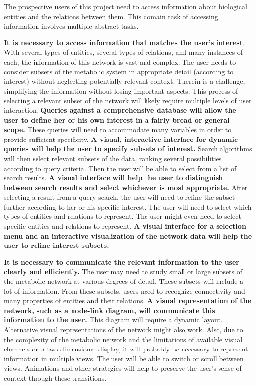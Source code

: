 The prospective users of this project need to access information about biological entities and the relations between them.
This domain task of accessing information involves multiple abstract tasks.

\textbf{It is necessary to access information that matches the user's interest}.
With several types of entities, several types of relations, and many instances of each, the information of this network is vast and complex.
The user needs to consider subsets of the metabolic system in appropriate detail (according to interest) without neglecting potentially-relevant context.
Therein is a challenge, simplifying the information without losing important aspects.
This process of selecting a relevant subset of the network will likely require multiple levels of user interaction.
\textbf{Queries against a comprehensive database will allow the user to define her or his own interest in a fairly broad or general scope.}
These queries will need to accommodate many variables in order to provide sufficient specificity.
\textbf{A visual, interactive interface for dynamic queries will help the user to specify subsets of interest.}
Search algorithms will then select relevant subsets of the data, ranking several possibilities according to query criteria.
Then the user will be able to select from a list of search results.
\textbf{A visual interface will help the user to distinguish between search results and select whichever is most appropriate.}
After selecting a result from a query search, the user will need to refine the subset further according to her or his specific interest.
The user will need to select which types of entities and relations to represent.
The user might even need to select specific entities and relations to represent.
\textbf{A visual interface for a selection menu and an interactive visualization of the network data will help the user to refine interest subsets.}

\textbf{It is necessary to communicate the relevant information to the user clearly and efficiently.}
The user may need to study small or large subsets of the metabolic network at various degrees of detail.
These subsets will include a lot of information.
From these subsets, users need to recognize connectivity and many properties of entities and their relations.
\textbf{A visual representation of the network, such as a node-link diagram, will communicate this information to the user.}
This diagram will require a dynamic layout.
Alternative visual representations of the network might also work.
Also, due to the complexity of the metabolic network and the limitations of available visual channels on a two-dimensional display, it will probably be necessary to represent information in multiple views.
The user will be able to switch or scroll between views.
Animations and other strategies will help to preserve the user's sense of context through these transitions.

